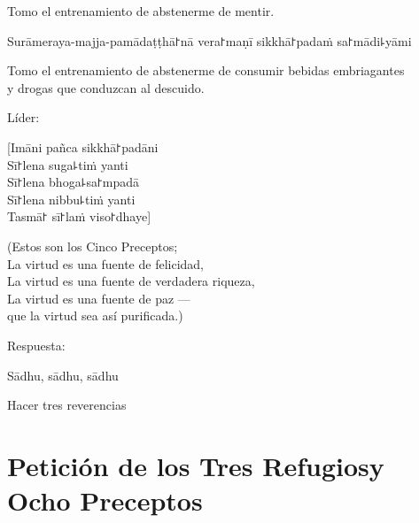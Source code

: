 \enlargethispage{\baselineskip}

\begin{english}
  Tomo el entrenamiento de abstenerme de mentir.
\end{english}

\clearpage

\begin{precept}
  \setcounter{enumi}{4}
  \item Surāmeraya-majja-pamādaṭṭhā꜓nā vera꜓maṇī sikkhā꜓padaṁ sa꜓mādi꜕yāmi
\end{precept}

\begin{english}
  Tomo el entrenamiento de abstenerme de consumir bebidas embriagantes\\
  y drogas que conduzcan al descuido.
\end{english}

\begin{instruction}
  Líder:
\end{instruction}

[Imāni pañca sikkhā꜓padāni\\
Sī꜓lena suga꜕tiṁ yanti\\
Sī꜓lena bhoga꜕sa꜓mpadā\\
Sī꜓lena nibbu꜕tiṁ yanti\\
Tasmā꜓ sī꜓laṁ viso꜓dhaye]

\begin{english}
  (Estos son los Cinco Preceptos;\\
  La virtud es una fuente de felicidad,\\
  La virtud es una fuente de verdadera riqueza,\\
  La virtud es una fuente de paz ---\\
  que la virtud sea así purificada.)
\end{english}

\begin{instruction}
  Respuesta:
\end{instruction}

Sādhu, sādhu, sādhu

\begin{instruction}
  Hacer tres reverencias
\end{instruction}

\clearpage
\chapter[Tres Refugios y Ocho Preceptos]{Petición de los Tres Refugios\newline y Ocho Preceptos}

